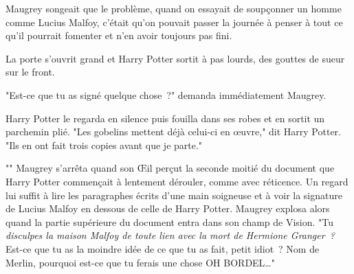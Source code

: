 Maugrey songeait que le problème, quand on essayait de soupçonner un homme comme Lucius Malfoy, c'était qu'on pouvait passer la journée à penser à tout ce qu'il pourrait fomenter et n'en avoir toujours pas fini.

La porte s'ouvrit grand et Harry Potter sortit à pas lourds, des gouttes de sueur sur le front.

"Est-ce que tu as signé quelque chose~?" demanda immédiatement Maugrey.

Harry Potter le regarda en silence puis fouilla dans ses robes et en sortit un parchemin plié. "Les gobelins mettent déjà celui-ci en œuvre," dit Harry Potter. "Ils en ont fait trois copies avant que je parte."

"" Maugrey s'arrêta quand son Œil perçut la seconde moitié du document que Harry Potter commençait à lentement dérouler, comme avec réticence. Un regard lui suffit à lire les paragraphes écrits d'une main soigneuse et à voir la signature de Lucius Malfoy en dessous de celle de Harry Potter. Maugrey explosa alors quand la partie supérieure du document entra dans son champ de Vision. "Tu \emph{disculpes la maison Malfoy de toute lien avec la mort de Hermione Granger~?} Est-ce que tu as la moindre idée de ce que tu as fait, petit idiot~? Nom de Merlin, pourquoi est-ce que tu ferais une chose OH BORDEL…" 

